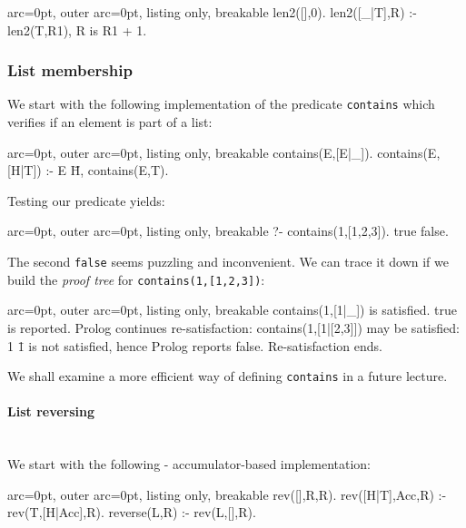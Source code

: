 \begin{tcblisting}{ arc=0pt, outer arc=0pt, listing only, breakable}
len2([],0).
len2([_|T],R) :- len2(T,R1), R is R1 + 1.

\end{tcblisting}


\subsubsection*{ List membership }

We start with the following implementation of the predicate \texttt{contains} which verifies if an element is part of a list:


\begin{tcblisting}{ arc=0pt, outer arc=0pt, listing only, breakable}
contains(E,[E|_]).
contains(E,[H|T]) :- E \= H, contains(E,T).

\end{tcblisting}


Testing our predicate yields:


\begin{tcblisting}{ arc=0pt, outer arc=0pt, listing only, breakable}
?- contains(1,[1,2,3]).
true 
false.

\end{tcblisting}


The second \texttt{false} seems puzzling and inconvenient. We can trace it down if we build the \textit{proof tree} for \texttt{contains(1,[1,2,3])}:

\begin{tcblisting}{ arc=0pt, outer arc=0pt, listing only, breakable}
contains(1,[1|_]) is satisfied. true is reported. Prolog continues re-satisfaction:
contains(1,[1|[2,3]]) may be satisfied:
  1 \= 1 is not satisfied, hence Prolog reports false. Re-satisfaction ends.

\end{tcblisting}


We shall examine a more efficient way of defining \texttt{contains} in a future lecture.

\paragraph{ List reversing }\hfill\\

We start with the following - accumulator-based implementation:


\begin{tcblisting}{ arc=0pt, outer arc=0pt, listing only, breakable}
rev([],R,R).
rev([H|T],Acc,R) :- rev(T,[H|Acc],R). 
reverse(L,R) :- rev(L,[],R).

\end{tcblisting}



